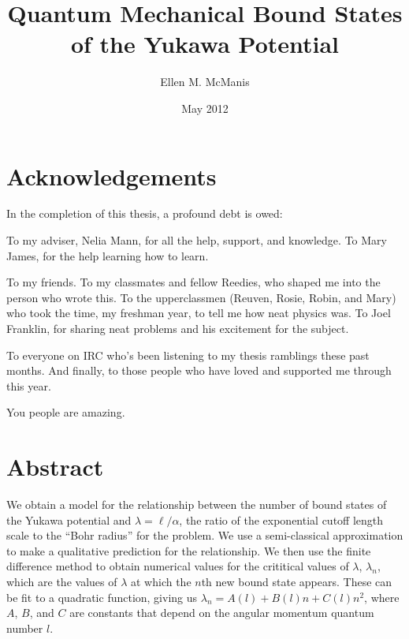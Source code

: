 \documentclass[12pt,twoside]{reedthesis}
\title{Quantum Mechanical Bound States of the Yukawa Potential}
\author{Ellen M. McManis}
\date{May 2012}
\begin{document}
  \maketitle
  \frontmatter %
  \pagestyle{empty} %

    \chapter*{Acknowledgements}
In the completion of this thesis, a profound debt is owed:

To my adviser, Nelia Mann, for all the help, support, and knowledge. To Mary James, for the help learning how to learn.

To my friends. To my classmates and fellow Reedies, who shaped me into the person who wrote this. To the upperclassmen (Reuven, Rosie, Robin, and Mary) who took the time, my freshman year, to tell me how neat physics was. To Joel Franklin, for sharing neat problems and his excitement for the subject. 

To everyone on IRC who's been listening to my thesis ramblings these past months. And finally, to those people who have loved and supported me through this year.

You people are amazing.

    \tableofcontents
    \listoftables
    \listoffigures

    \chapter*{Abstract}
We obtain a model for the relationship between the number of bound states of the Yukawa potential and $\lambda = \ell/\alpha$, the ratio of the exponential cutoff length scale to the ``Bohr radius'' for the problem. We use a semi-classical approximation to make a qualitative prediction for the relationship. We then use the finite difference method to obtain numerical values for the crititical values of $\lambda$, $\lambda_n$, which are the values of $\lambda$ at which the $n$th new bound state appears. These can be fit to a quadratic function, giving us $\lambda_n = A(l) + B(l)n + C(l)n^2$, where $A$, $B$, and $C$ are constants that depend on the angular momentum quantum number $l$. 
\end{document}
